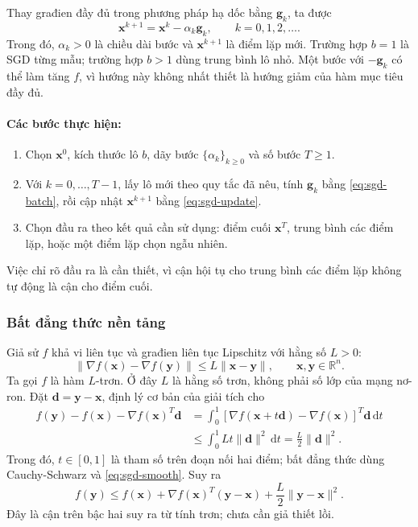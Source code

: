 Thay građien đầy đủ trong phương pháp hạ dốc bằng $\mathbf{g}_k$, ta được
\begin{equation}
 \boxed{\mathbf{x}^{k+1}=\mathbf{x}^{k}-\alpha_k\mathbf{g}_k,}
 \qquad k=0,1,2,\ldots.
 \label{eq:sgd-update}
\end{equation}
Trong đó, $\alpha_k>0$ là chiều dài bước và $\mathbf{x}^{k+1}$ là điểm lặp mới. Trường hợp $b=1$ là SGD từng mẫu; trường hợp $b>1$ dùng trung bình lô nhỏ. Một bước với $-\mathbf{g}_k$ có thể làm tăng $f$, vì hướng này không nhất thiết là hướng giảm của hàm mục tiêu đầy đủ.

\paragraph{Các bước thực hiện:}
\begin{enumerate}
 \item Chọn $\mathbf{x}^{0}$, kích thước lô $b$, dãy bước
 $\{\alpha_k\}_{k\geq0}$ và số bước $T\geq1$.
 \item Với $k=0,\ldots,T-1$, lấy lô mới theo quy tắc đã nêu,
 tính $\mathbf{g}_k$ bằng \eqref{eq:sgd-batch}, rồi cập nhật
 $\mathbf{x}^{k+1}$ bằng \eqref{eq:sgd-update}.
 \item Chọn đầu ra theo kết quả cần sử dụng: điểm cuối $\mathbf{x}^{T}$,
 trung bình các điểm lặp, hoặc một điểm lặp chọn ngẫu nhiên.
\end{enumerate}
Việc chỉ rõ đầu ra là cần thiết, vì cận hội tụ cho trung bình các điểm lặp không tự động là cận cho điểm cuối.
\subsubsection{Bất đẳng thức nền tảng}
Giả sử $f$ khả vi liên tục và građien liên tục Lipschitz với hằng số $L>0$:
\begin{equation}
 \|\nabla f(\mathbf{x})-\nabla f(\mathbf{y})\|
 \leq L\|\mathbf{x}-\mathbf{y}\|,
 \qquad \mathbf{x},\mathbf{y}\in\mathbb{R}^{n}.
 \label{eq:sgd-smooth}
\end{equation}
Ta gọi $f$ là hàm $L$-trơn. Ở đây $L$ là hằng số trơn, không phải số lớp
của mạng nơ-ron. Đặt $\mathbf{d}=\mathbf{y}-\mathbf{x}$, định lý cơ bản
của giải tích cho
\begin{align*}
 f(\mathbf{y})-f(\mathbf{x})-\nabla f(\mathbf{x})^T\mathbf{d}
 &=\int_0^1[\nabla f(\mathbf{x}+t\mathbf{d})-
                 \nabla f(\mathbf{x})]^T\mathbf{d}\,\mathrm{d}t\\
 &\leq\int_0^1 Lt\|\mathbf{d}\|^2\,\mathrm{d}t
 =\frac{L}{2}\|\mathbf{d}\|^2.
\end{align*}
Trong đó, $t\in[0,1]$ là tham số trên đoạn nối hai điểm; bất đẳng thức
dùng Cauchy-Schwarz và \eqref{eq:sgd-smooth}. Suy ra
\begin{equation}
 f(\mathbf{y})\leq f(\mathbf{x})+
 \nabla f(\mathbf{x})^T(\mathbf{y}-\mathbf{x})
 +\frac{L}{2}\|\mathbf{y}-\mathbf{x}\|^2.
 \label{eq:sgd-descent-lemma}
\end{equation}
Đây là cận trên bậc hai suy ra từ tính trơn; chưa cần giả thiết lồi.

